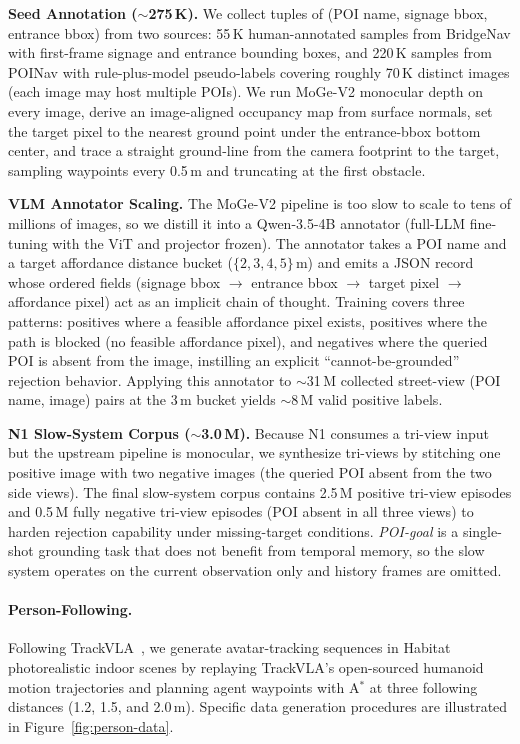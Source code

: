 \textbf{Seed Annotation ($\sim$275\,K).}
We collect tuples of (POI name, signage bbox, entrance bbox) from
two sources: 55\,K human-annotated samples from BridgeNav with
first-frame signage and entrance bounding boxes, and 220\,K samples
from POINav with rule-plus-model pseudo-labels covering roughly
70\,K distinct images (each image may host multiple POIs).
We run MoGe-V2 \cite{wang2025moge} monocular depth on every image, derive an
image-aligned occupancy map from surface normals, set the target
pixel to the nearest ground point under the entrance-bbox bottom
center, and trace a straight ground-line from the camera footprint
to the target, sampling waypoints every 0.5\,m and truncating at
the first obstacle.

\textbf{VLM Annotator Scaling.}
The MoGe-V2 pipeline is too slow to scale to tens of millions of
images, so we distill it into a Qwen-3.5-4B annotator (full-LLM
fine-tuning with the ViT and projector frozen). The annotator takes
a POI name and a target affordance distance bucket
($\{2,3,4,5\}$\,m) and emits a JSON record whose ordered fields
(signage bbox $\rightarrow$ entrance bbox $\rightarrow$ target pixel
$\rightarrow$ affordance pixel) act as an implicit chain of thought.
Training covers three patterns: positives where a feasible
affordance pixel exists, positives where the path is blocked
(no feasible affordance pixel), and negatives where the queried POI
is absent from the image, instilling an explicit
``cannot-be-grounded'' rejection behavior. Applying this annotator
to $\sim$31\,M collected street-view (POI name, image) pairs
at the 3\,m bucket yields $\sim$8\,M valid positive labels.

\textbf{N1 Slow-System Corpus ($\sim$3.0\,M).}
Because N1 consumes a tri-view input but the upstream pipeline is
monocular, we synthesize tri-views by stitching one positive image
with two negative images (the queried POI absent from the two side
views). The final slow-system corpus contains 2.5\,M positive
tri-view episodes and 0.5\,M fully negative tri-view episodes (POI
absent in all three views) to harden rejection capability under
missing-target conditions. \textit{POI-goal} is a single-shot grounding task
that does not benefit from temporal memory, so the slow system
operates on the current observation only and history frames are
omitted.

\paragraph{Person-Following.}
Following TrackVLA~\cite{wang2025trackvla}, we generate
avatar-tracking sequences in Habitat~\cite{savva2019habitat}
photorealistic indoor scenes by replaying TrackVLA's open-sourced
humanoid motion trajectories and planning agent waypoints with
A$^{\!*}$ at three following distances (1.2, 1.5, and 2.0\,m). Specific data generation procedures are illustrated in Figure~\ref{fig:person-data}.


